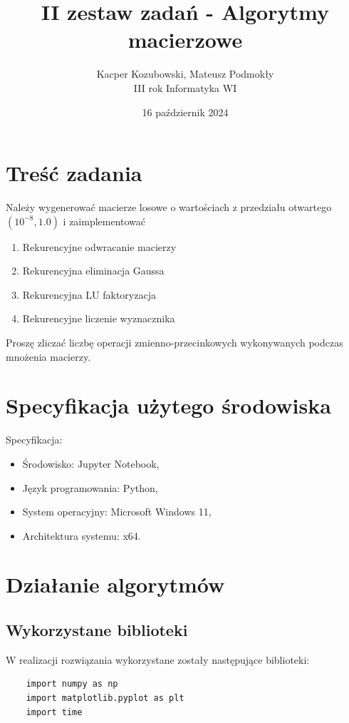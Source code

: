 \documentclass[11pt, leqno]{scrartcl}
\title{II zestaw zadań - Algorytmy macierzowe}
\author{Kacper Kozubowski, Mateusz Podmokły \\ III
    rok Informatyka WI}
\date{16 październik 2024}
\begin{document}
    \maketitle
    \section{Treść zadania}
    Należy wygenerować macierze losowe o wartościach
    z przedziału otwartego $(10^{-8},1.0)$
    i zaimplementować
    \begin{enumerate}
        \item Rekurencyjne odwracanie macierzy
        \item Rekurencyjna eliminacja Gaussa
        \item Rekurencyjna LU faktoryzacja
        \item Rekurencyjne liczenie wyznacznika
    \end{enumerate}
    Proszę zliczać liczbę operacji zmienno-przecinkowych
    wykonywanych podczas mnożenia macierzy.

    \section{Specyfikacja użytego środowiska}
    Specyfikacja:
    \begin{itemize}
        \item Środowisko: Jupyter Notebook,
        \item Język programowania: Python,
        \item System operacyjny: Microsoft Windows 11,
        \item Architektura systemu: x64.
    \end{itemize}

    \section{Działanie algorytmów}
    \subsection{Wykorzystane biblioteki}
    W realizacji rozwiązania wykorzystane zostały następujące
    biblioteki:
    \begin{lstlisting}
    import numpy as np
    import matplotlib.pyplot as plt
    import time
    \end{lstlisting}
\end{document}
